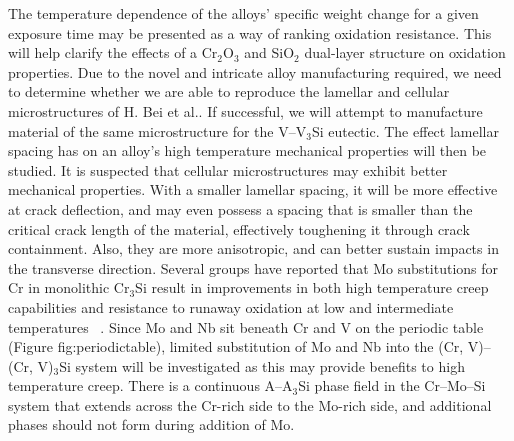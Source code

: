 %
The temperature dependence of the alloys' specific weight change for a given exposure time may be presented as a way of ranking oxidation resistance. This will help clarify the effects of a Cr$_2$O$_3$ and SiO$_2$ dual-layer structure on oxidation properties. Due to the novel and intricate alloy manufacturing required, we need to determine whether we are able to reproduce the lamellar and cellular microstructures of H. Bei et al.. If successful, we will attempt to manufacture material of the same microstructure for the V--V$_3$Si eutectic. The effect lamellar spacing has on an alloy's high temperature mechanical properties will then be studied. It is suspected that cellular microstructures may exhibit better mechanical properties. With a smaller lamellar spacing, it will be more effective at crack deflection, and may even possess a spacing that is smaller than the critical crack length of the material, effectively toughening it through crack containment. Also, they are more anisotropic, and can better sustain impacts in the transverse direction. Several groups have reported that Mo substitutions for Cr in monolithic Cr$_3$Si result in improvements in both high temperature creep capabilities and resistance to runaway oxidation at low and intermediate temperatures ~\cite{raj95}. Since Mo and Nb sit beneath Cr and V on the periodic table (Figure {fig:periodictable}), limited substitution of Mo and Nb into the (Cr, V)--(Cr, V)$_3$Si system will be investigated as this may provide benefits to high temperature creep. There is a continuous A--A$_3$Si phase field in the Cr--Mo--Si system that extends across the Cr-rich side to the Mo-rich side, and additional phases should not form during addition of Mo.